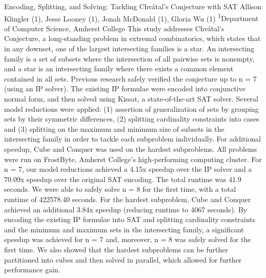 \makeabstract
{
Encoding, Splitting, and Solving: Tackling Chvátal’s Conjecture with SAT
}
{
Allison Klingler (1), Jesse Looney (1), Jonah McDonald (1), Gloria Wu (1)
}
{
\textsuperscript{1}Department of Computer Science, Amherst College
}
{
This study addresses Chvátal’s Conjecture, a long-standing problem in extremal combinatorics, which states that in any downset, one of the largest intersecting families is a star. An intersecting family is a set of subsets where the intersection of all pairwise sets is nonempty, and a star is an intersecting family where there exists a common element contained in all sets. Previous research safely verified the conjecture up to n = 7 (using an IP solver).
}
{
The existing IP formulae were encoded into conjunctive normal form, and then solved using Kissat, a state-of-the-art SAT solver. Several model reductions were applied: (1) assertion of generalization of sets by grouping sets by their symmetric differences, (2) splitting cardinality constraints into cases and (3) splitting on the maximum and minimum size of subsets in the intersecting family in order to tackle each subproblem individually. For additional speedup, Cube and Conquer was used on the hardest subproblems. All problems were run on FrostByte, Amherst College’s high-performing computing cluster.
}
{
For n = 7, our model reductions achieved a 4.15x speedup over the IP solver and a 70.09x speedup over the original SAT encoding. The total runtime was 41.9 seconds.
We were able to safely solve n = 8 for the first time, with a total runtime of 422578.40 seconds. For the hardest subproblem, Cube and Conquer achieved an additional 3.84x speedup (reducing runtime to 4067 seconds).
}
{
By encoding the existing IP formulae into SAT and splitting cardinality constraints and the minimum and maximum sets in the intersecting family, a significant speedup was achieved for n = 7 and, moreover, n = 8 was safely solved for the first time. We also showed that the hardest subproblems can be further partitioned into cubes and then solved in parallel, which allowed for further performance gain. 
}

\newpage
